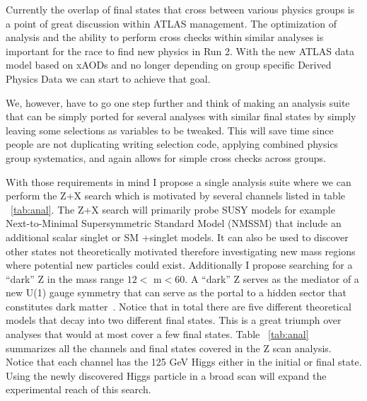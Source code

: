 Currently the overlap of final states that cross between various physics groups is a point of great discussion within ATLAS management.  The optimization of analysis and the ability to perform 
cross checks within similar analyses is important for the race to find new physics in Run 2.  With the new ATLAS data model based on xAODs and no longer depending on group specific Derived Physics Data we can start to achieve that goal.

We, however, have to go one step further and think of making an analysis suite that can be simply ported for several analyses with similar final states by simply leaving some selections as variables to 
be tweaked.  This will save time since people are not duplicating writing selection code, applying combined physics group systematics,  and again allows for simple cross checks across groups.  

With those requirements in mind I propose a single analysis suite where we can perform the Z+X search which is motivated by several channels listed in table ~\ref{tab:anal}.
The Z+X search will primarily probe SUSY models for example Next-to-Minimal Supersymmetric Standard Model (NMSSM) that include an additional scalar singlet or SM +singlet models.  It can also be used to discover other states not theoretically motivated therefore investigating new mass regions where potential new particles could exist.
Additionally I propose searching for a ``dark'' Z in the mass range $12<$ m$<60$. A ``dark'' Z serves as the mediator of a new U(1) gauge symmetry that can serve as the portal to a hidden sector that constitutes dark matter~\cite{zdark}. 
Notice that in total there are five different theoretical models that decay into two different final states.  This is a great triumph over analyses that would at most cover a few final states.
Table ~\ref{tab:anal} summarizes all the channels and final states covered in the Z scan analysis.  Notice that each channel has the 125 GeV Higgs either in the initial or final state. 
Using the newly discovered Higgs particle in a broad scan will expand the experimental reach of this search.

